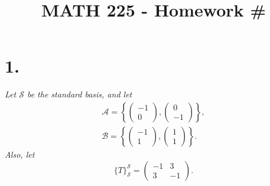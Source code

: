 \documentclass[12pt]{article}
\title{\vspace{-2\baselineskip}MATH 225 - Homework \#\HOMEWORKNUM}
\author{\NAME}
\date{\DATE}
\newcommand{\based}[3]{{\{#1\}}_{#2}^{#3}}
\begin{document}
\maketitle

\section*{1.}
\textit{Let $\mathcal{S}$ be the standard basis, and let}
\begin{gather*}
	\mathcal{A}
	=
	\left\{
		\begin{pmatrix} -1 \\ 0 \end{pmatrix},
		\begin{pmatrix} 0 \\ -1 \end{pmatrix}
	\right\}
	,
	\\
	\mathcal{B}
	=
	\left\{
		\begin{pmatrix} -1 \\ 1 \end{pmatrix},
		\begin{pmatrix} 1 \\ 1 \end{pmatrix}
	\right\}
	.
\end{gather*}
\textit{Also, let}
\begin{equation*}
	\based{T}{\mathcal{S}}{\mathcal{S}}
	=
	\begin{pmatrix}
		-1 & 3 \\
		3 & -1
	\end{pmatrix}
	.
\end{equation*}
\end{document}
